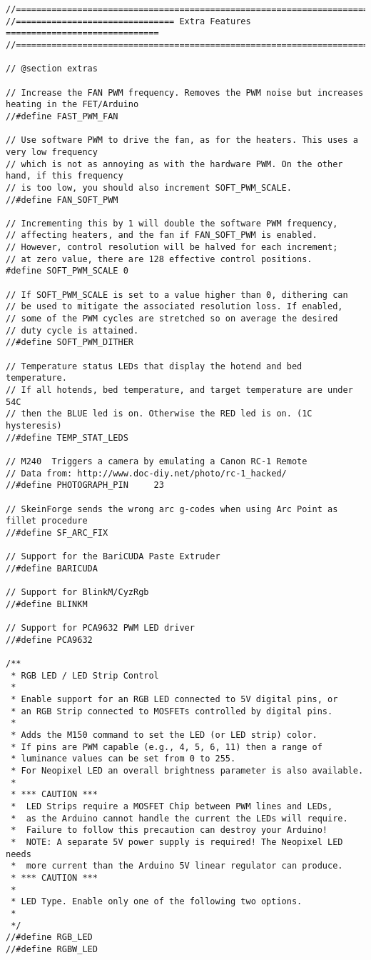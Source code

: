\begin{lstlisting}
//=============================================================================
//=============================== Extra Features ==============================
//=============================================================================

// @section extras

// Increase the FAN PWM frequency. Removes the PWM noise but increases heating in the FET/Arduino
//#define FAST_PWM_FAN

// Use software PWM to drive the fan, as for the heaters. This uses a very low frequency
// which is not as annoying as with the hardware PWM. On the other hand, if this frequency
// is too low, you should also increment SOFT_PWM_SCALE.
//#define FAN_SOFT_PWM

// Incrementing this by 1 will double the software PWM frequency,
// affecting heaters, and the fan if FAN_SOFT_PWM is enabled.
// However, control resolution will be halved for each increment;
// at zero value, there are 128 effective control positions.
#define SOFT_PWM_SCALE 0

// If SOFT_PWM_SCALE is set to a value higher than 0, dithering can
// be used to mitigate the associated resolution loss. If enabled,
// some of the PWM cycles are stretched so on average the desired
// duty cycle is attained.
//#define SOFT_PWM_DITHER

// Temperature status LEDs that display the hotend and bed temperature.
// If all hotends, bed temperature, and target temperature are under 54C
// then the BLUE led is on. Otherwise the RED led is on. (1C hysteresis)
//#define TEMP_STAT_LEDS

// M240  Triggers a camera by emulating a Canon RC-1 Remote
// Data from: http://www.doc-diy.net/photo/rc-1_hacked/
//#define PHOTOGRAPH_PIN     23

// SkeinForge sends the wrong arc g-codes when using Arc Point as fillet procedure
//#define SF_ARC_FIX

// Support for the BariCUDA Paste Extruder
//#define BARICUDA

// Support for BlinkM/CyzRgb
//#define BLINKM

// Support for PCA9632 PWM LED driver
//#define PCA9632

/**
 * RGB LED / LED Strip Control
 *
 * Enable support for an RGB LED connected to 5V digital pins, or
 * an RGB Strip connected to MOSFETs controlled by digital pins.
 *
 * Adds the M150 command to set the LED (or LED strip) color.
 * If pins are PWM capable (e.g., 4, 5, 6, 11) then a range of
 * luminance values can be set from 0 to 255.
 * For Neopixel LED an overall brightness parameter is also available.
 *
 * *** CAUTION ***
 *  LED Strips require a MOSFET Chip between PWM lines and LEDs,
 *  as the Arduino cannot handle the current the LEDs will require.
 *  Failure to follow this precaution can destroy your Arduino!
 *  NOTE: A separate 5V power supply is required! The Neopixel LED needs
 *  more current than the Arduino 5V linear regulator can produce.
 * *** CAUTION ***
 *
 * LED Type. Enable only one of the following two options.
 *
 */
//#define RGB_LED
//#define RGBW_LED


\end{lstlisting}
